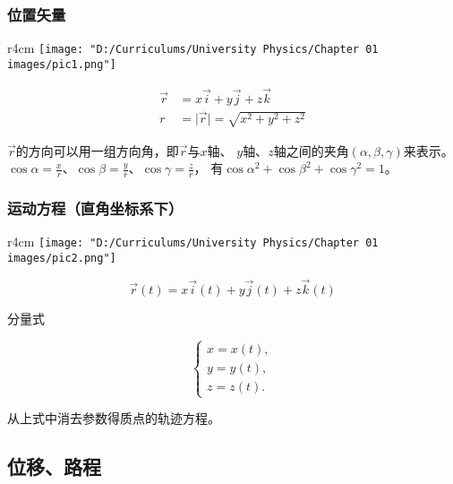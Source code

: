 \documentclass[12pt, a4paper]{article}
\begin{document}
\subsubsection{位置矢量}

    \begin{wrapfigure}{r}{4cm}
        \centering
        \texttt{[image: "D:/Curriculums/University Physics/Chapter 01 images/pic1.png"]}
        \label{pic1}
    \end{wrapfigure}

    \begin{align*}
        \overrightarrow{r} &= x\overrightarrow{i} + y\overrightarrow{j} + z\overrightarrow{k} \\
        r &= \lvert\overrightarrow{r}\rvert = \sqrt{x^2 + y^2 + z^2}
    \end{align*}

    \(\overrightarrow{r}\)的方向可以用一组方向角，即\(\overrightarrow{r}\)与\(x\)轴、
    \(y\)轴、\(z\)轴之间的夹角\(\left(\alpha, \beta, \gamma\right)\)来表示。
    \(\cos \alpha = \frac{x}{r}\)、\(\cos \beta = \frac{y}{r}\)、\(\cos \gamma = \frac{z}{r}\)，
    有\(\cos \alpha ^2 + \cos \beta ^2 + \cos \gamma ^2 = 1\)。

\subsubsection{运动方程（直角坐标系下）}
    
    \begin{wrapfigure}{r}{4cm}
        \centering
        \texttt{[image: "D:/Curriculums/University Physics/Chapter 01 images/pic2.png"]}
        \label{pic2}
    \end{wrapfigure}

    \[
        \overrightarrow{r}\left(t\right) = 
        x\overrightarrow{i}\left(t\right) + y\overrightarrow{j}\left(t\right)
        + z\overrightarrow{k}\left(t\right)
    \]

    分量式

    \[
    \begin{cases}
    x = x\left(t\right), \\
    y = y\left(t\right), \\ 
    z = z\left(t\right).
    \end{cases}
    \]

    从上式中消去参数得质点的{\heiti 轨迹方程}。

\subsection{位移、路程}
\end{document}
